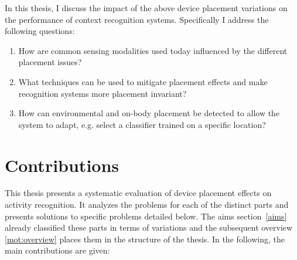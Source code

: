 In this thesis, I discuss the impact of the above device placement
variations on the performance of context recognition
systems. Specifically I address the following questions:

\begin{enumerate}
\item How are common sensing modalities used today influenced by the different
 placement issues?
\item What techniques can be used to mitigate placement effects and
 make recognition systems more placement invariant?
\item How can environmental and on-body placement be detected to allow the system to adapt,
 e.g. select a classifier trained on a specific location? 
\end{enumerate}


\section{Contributions}
\label{contributions}

This thesis presents a systematic evaluation of device placement
effects on activity recognition. It analyzes the problems for each of
the distinct parts and presents solutions to specific problems detailed below. 
The aims section~\ref{aims} already classified these parts in terms of variations
and the subsequent overview \ref{mot:overview} places them in the structure of the
thesis. 
In the following, the main contributions are given:

